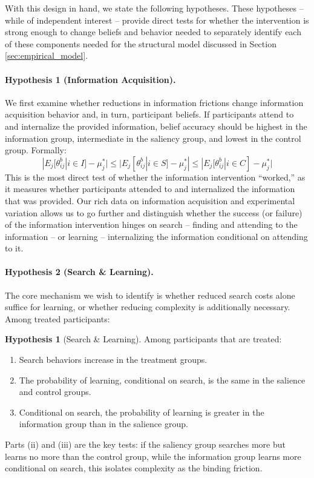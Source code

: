 \documentclass[12pt]{article}
\theoremstyle{definition}
\newtheorem{hypothesis}{Hypothesis}
\theoremstyle{remark}
\begin{document}
With this design in hand, we state the following hypotheses. These hypotheses -- while of independent interest -- provide direct tests for whether the intervention is strong enough to change beliefs and behavior needed to separately identify each of these components needed for the structural model discussed in Section \ref{sec:empirical_model}.

\paragraph{Hypothesis 1 (Information Acquisition).}
We first examine whether reductions in information frictions change information acquisition behavior and, in turn, participant beliefs. If participants attend to and internalize the provided information, belief accuracy should be highest in the information group, intermediate in the saliency group, and lowest in the control group. Formally:
$$|E_j[\theta^b_{ij} | i \in I] - \mu^*_j| \leq |E_j[\theta^b_{ij} | i \in S] - \mu^*_j| \leq |E_j[\theta^b_{ij} | i \in C] - \mu^*_j|$$
This is the most direct test of whether the information intervention ``worked,'' as it measures whether participants attended to and internalized the information that was provided. Our rich data on information acquisition and experimental variation allows us to go further and distinguish whether the success (or failure) of the information intervention hinges on search -- finding and attending to the information -- or learning -- internalizing the information conditional on attending to it. 

\paragraph{Hypothesis 2 (Search \& Learning).}
The core mechanism we wish to identify is whether reduced search costs alone suffice for learning, or whether reducing complexity is additionally necessary. Among treated participants:
\begin{hypothesis}[Search \& Learning]\label{hyp:info_by_group}
Among participants that are treated:
\begin{enumerate}[label=(\roman*)]
\item Search behaviors increase in the treatment groups.
\item The probability of learning, conditional on search, is the same in the salience and control groups.
\item Conditional on search, the probability of learning is greater in the information group than in the salience group.
\end{enumerate}
\end{hypothesis}
Parts (ii) and (iii) are the key tests: if the saliency group searches more but learns no more than the control group, while the information group learns more conditional on search, this isolates complexity as the binding friction.
\end{document}
